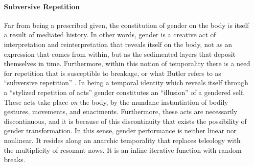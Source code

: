 \paragraph{Subversive Repetition}
Far from being a prescribed given, the constitution of gender on the body is itself a result of mediated history. In other words, gender is a creative act of interpretation and reinterpretation that reveals itself on the body, not as an expression that comes from within, but as the sedimented layers that deposit themselves in time. Furthermore, within this notion of temporality there is a need for repetition that is susceptible to breakage, or what Butler refers to as ``subversive repetition'' \parencite[520]{But88:Per}. In being a temporal identity which reveals itself through a ``stylized repetition of acts'' gender constitutes an ``illusion'' of a gendered self. These acts take place \textit{on} the body, by the mundane instantiation of bodily gestures, movements, and enactments. Furthermore, these acts are necessarily discontinuous, and it is because of this discontinuity that exists the possibility of gender transformation. In this sense, gender performance is neither linear nor nonlinear. It resides along an anarchic temporality that replaces teleology with the multiplicity of resonant nows. It is an inline iterative function with random breaks. 

